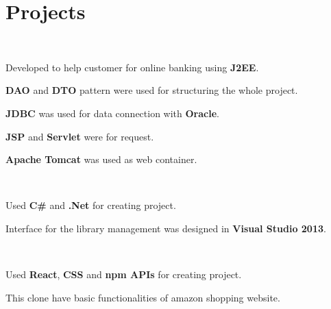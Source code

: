 \documentclass[]{deedy-resume-openfont}
\begin{document}
\hfill
\begin{minipage}[t]{0.66\textwidth} 





\section{Projects}

\\
\sectionsep
\begin{tightemize}
\item Developed to help customer for online banking using \textbf{J2EE}.
\item \textbf{DAO} and \textbf{DTO} pattern were used for structuring the whole project.
\item \textbf{JDBC} was used for data connection with  \textbf{Oracle}.
\item \textbf{JSP} and \textbf{Servlet} were for request.
\item \textbf{Apache Tomcat} was used as web container.
\end{tightemize}
\sectionsep

\\
\begin{tightemize}
\item Used \textbf{C\#} and \textbf{.Net} for creating project.
\item Interface for the library management was designed in \textbf{Visual Studio 2013}. 
\end{tightemize}
\sectionsep

\\
\begin{tightemize}
\item Used \textbf{React}, \textbf{CSS} and \textbf{npm APIs} for creating project.
\item This clone have basic functionalities of amazon shopping website. 
\end{tightemize}
\sectionsep



\end{minipage}
\end{document}
